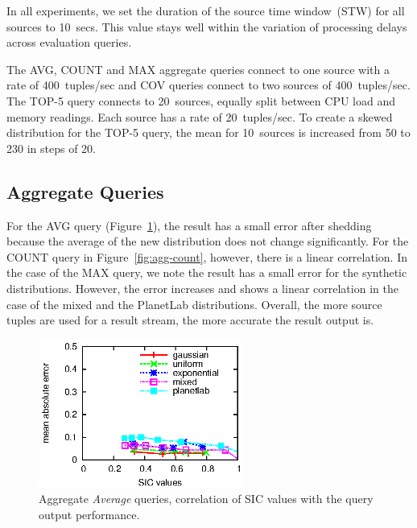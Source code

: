 In all experiments, we set the duration of the source time window~(STW) for all
sources to 10~secs. This value stays well within the variation of processing
delays across evaluation queries.
 




The \textnormal{AVG}, \textnormal{COUNT} and \textnormal{MAX}
aggregate queries connect to one source with a rate of 400~tuples/sec and \textnormal{COV}
queries connect to two sources of 400~tuples/sec. 
The \textnormal{TOP-5} query connects to 20~sources, equally split between CPU load and
memory readings. Each source has a rate of 20~tuples/sec. To create a skewed
distribution for the \textnormal{TOP-5} query, the mean for 10~sources is increased
from 50 to 230 in steps of 20.


\clearpage

\subsection{Aggregate Queries}

 
For the \textnormal{AVG} query (Figure~\ref{fig:agg-avg}), the result has a small error
after shedding because the average of the new distribution does not change
significantly. For the \textnormal{COUNT} query in Figure~\ref{fig:agg-count}, however,
there is a linear correlation. In the case of the \textnormal{MAX} query, we note
the result has a small error for the synthetic distributions. However, the error
increases and shows a linear correlation in the case of the mixed and the PlanetLab
distributions. Overall, the more source tuples are used for a result
stream, the more accurate the result output is.

\begin{figure}[h]
\centering
\includegraphics[width=0.6\textwidth]{img/tesi/avg1}
\caption{Aggregate \emph{Average} queries, correlation of SIC values with the query output performance.}
\label{fig:agg-avg}
\end{figure} 

